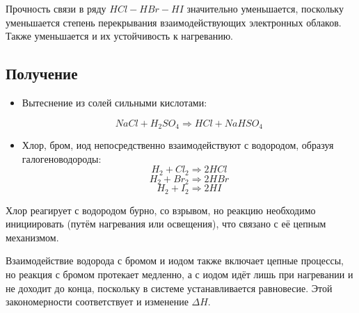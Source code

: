 \documentclass[11pt]{article}
\begin{document}
Прочность связи в ряду $HCl - HBr - HI$ значительно уменьшается, поскольку уменьшается
степень перекрывания взаимодействующих электронных облаков. Также уменьшается и их
устойчивость к нагреванию.

\subsection{Получение}
\begin{itemize}
\item Вытеснение из солей сильными кислотами:

$$NaCl+H_{2}SO_{4}\Rightarrow HCl+NaHSO_{4}$$
\item Хлор, бром, иод непосредственно взаимодействуют с водородом, образуя галогеноводороды:
$$H_{2}+Cl_{2}\Rightarrow 2HCl$$
$$H_{2}+Br_{2}\Rightarrow 2HBr$$
$$H_{2}+I_{2}\Rightarrow 2HI$$
\end{itemize}
Хлор реагирует с водородом бурно, со взрывом, но реакцию необходимо инициировать (путём нагревания или освещения), что связано с её цепным механизмом.

Взаимодействие водорода с бромом и иодом также включает цепные процессы, но реакция с бромом протекает медленно, а с иодом идёт лишь при нагревании и не доходит до конца, поскольку в системе устанавливается равновесие. Этой закономерности соответствует и изменение $\Delta H$.
\end{document}
